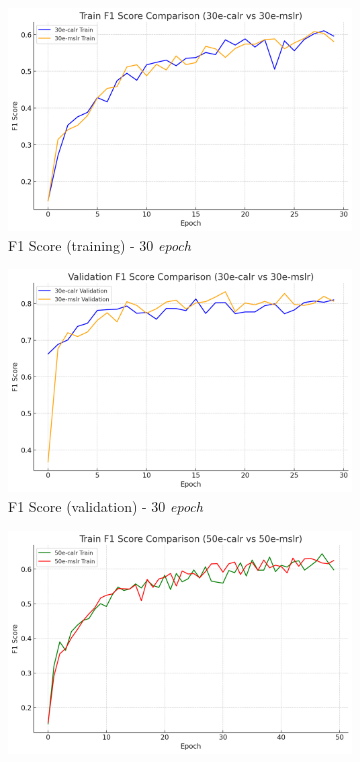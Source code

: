 \begin{figure}[htbp]
  \centering
  \begin{subfigure}{0.45\textwidth}
    \includegraphics[width=\textwidth]{gambar/bab4-train-f1-score-30e.png}
    \caption{F1 Score (training) - 30 \emph{epoch}}
  \end{subfigure}
  \hfill
  \begin{subfigure}{0.45\textwidth}
    \includegraphics[width=\textwidth]{gambar/bab4-val-f1-score-30e.png}
    \caption{F1 Score (validation) - 30 \emph{epoch}}
  \end{subfigure}
  \hfill
  \begin{subfigure}{0.45\textwidth}
    \includegraphics[width=\textwidth]{gambar/bab4-train-f1-score-50e.png}

\end{subfigure}
\end{figure}
